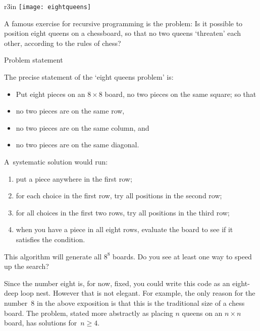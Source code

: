 
\begin{wrapfigure}{r}{3in}
  \texttt{[image: eightqueens]}
\end{wrapfigure}
A famous exercise for recursive programming is the
 problem:
Is it possible to position eight queens on a chessboard,
so that no two queens `threaten' each other,
according to the rules of chess?

 {Problem statement}

The precise statement of the `eight queens problem' is:
\begin{itemize}
\item Put eight pieces on an $8\times8$ board, no two pieces on the same square; so that
\item no two pieces are on the same row,
\item no two pieces are on the same column, and
\item no two pieces are on the same diagonal.
\end{itemize}
A~systematic solution would run:
\begin{enumerate}
\item put a piece anywhere in the first row;
\item for each choice in the first row, try all positions in the second row;
\item for all choices in the first two rows, try all positions in the third row;
\item when you have a piece in all eight rows, evaluate the board to
  see if it satisfies the condition.
\end{enumerate}
\begin{exercise}
  This algorithm will generate all $8^8$ boards.
  Do you see at least one way to speed up the search?
\end{exercise}

Since the number eight is, for now, fixed, you could write this code
as an eight-deep loop nest. However that is not elegant.
For example, the only reason for the number~8 in the above exposition
is that this is the traditional size of a chess board.
The problem, stated more abstractly as placing $n$ queens on an $n\times n$ board,
has solutions for~$n\geq 4$.


